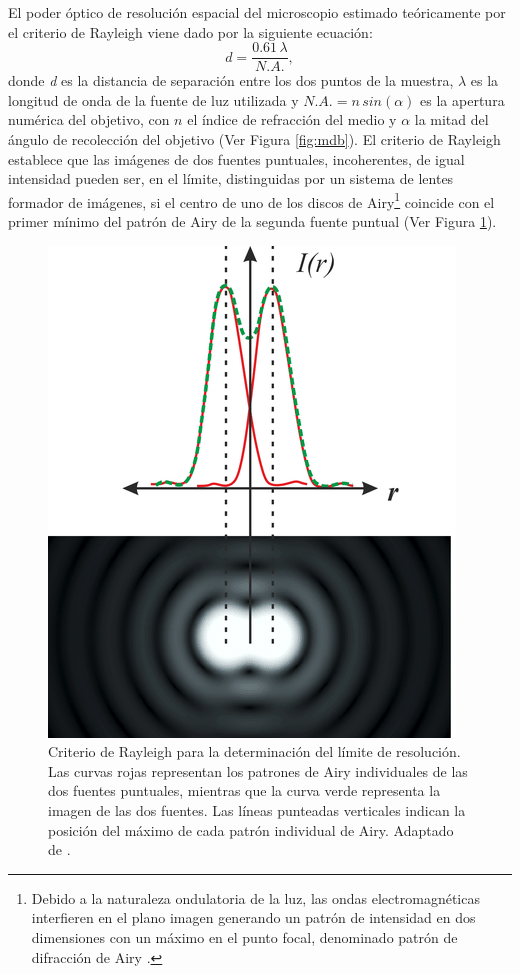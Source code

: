 El poder óptico de resolución espacial del microscopio estimado teóricamente por el criterio de Rayleigh viene dado por la siguiente ecuación:
\begin{equation}
d = \frac{0.61 \hspace{2pt} \lambda}{ N.A.},
\end{equation}
donde \textit{d} es la distancia de separación entre los dos puntos de la muestra, $\lambda$ es la longitud de onda de la fuente de luz utilizada y $N.A. = n \hspace{2pt} sin(\alpha)$ es la apertura numérica del objetivo, con $n$ el índice de refracción del medio y $\alpha$ la mitad del ángulo de recolección del objetivo (Ver Figura \ref{fig:mdb}). El criterio de Rayleigh establece que las imágenes de dos fuentes puntuales, incoherentes, de igual intensidad pueden ser, en el límite, distinguidas por un sistema de lentes formador de imágenes, si el centro de uno de los discos de Airy\footnote{Debido a la naturaleza ondulatoria de la luz, las ondas
electromagnéticas interfieren en el plano imagen generando un patrón de intensidad en dos dimensiones con
un máximo en el punto focal, denominado patrón de difracción de Airy \cite{hecht2012optics}.} coincide con el primer mínimo del patrón de Airy de la segunda fuente puntual (Ver Figura \ref{fig:critrayspa}).

\begin{figure}[H]
	\centering
	\includegraphics[scale=1.0]{Figs/microespectrometro/raylspa.png}
	\caption{Criterio de Rayleigh para la determinación del límite de resolución. Las curvas rojas representan los patrones de Airy individuales de las dos fuentes puntuales, mientras que la curva verde representa la imagen de las dos fuentes. Las líneas punteadas verticales indican la posición del máximo de cada patrón individual de Airy. Adaptado de \cite{raylsp}.}
	\label{fig:critrayspa}
\end{figure}

